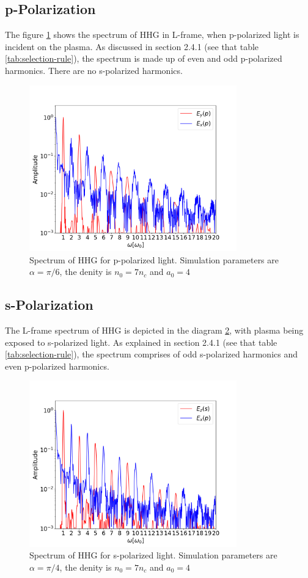\documentclass[12pt]{article}
\begin{document}
\subsection{p-Polarization}
The figure \ref{fig:p-fft} shows the spectrum of HHG in L-frame, when p-polarized light is incident on the plasma. As discussed in section 2.4.1 (see that table \ref{tab:selection-rule}), the spectrum is made up of even and odd p-polarized harmonics. There are no s-polarized harmonics.
\begin{figure}[h]
    \centering
    \includegraphics[width=0.8\textwidth]{images/p_fft.png}
    \caption{Spectrum of HHG for p-polarized light. Simulation parameters are $\alpha = \pi/6$, the denity is $n_0 = 7n_c$ and $a_0 = 4$}
    \label{fig:p-fft}
\end{figure}

\subsection{s-Polarization}
The L-frame spectrum of HHG is depicted in the diagram \ref{fig:s-fft}, with plasma being exposed to s-polarized light. As explained in section 2.4.1 (see that table \ref{tab:selection-rule}), the spectrum comprises of odd s-polarized harmonics and even p-polarized harmonics.
\begin{figure}[h]
    \centering
    \includegraphics[width=0.8\textwidth]{images/s_fft.png}
    \caption{Spectrum of HHG for s-polarized light. Simulation parameters are $\alpha = \pi/4$, the denity is $n_0 = 7n_c$ and $a_0 = 4$}
    \label{fig:s-fft}
\end{figure}
\end{document}
